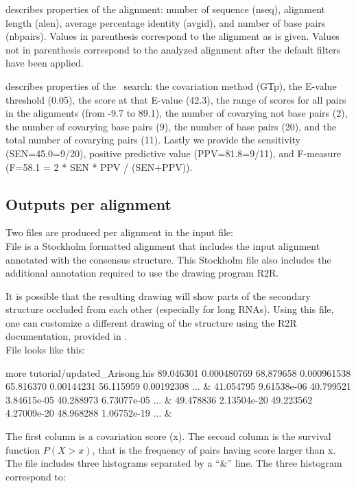  \begin{sreitems}{}
 \item[\prog{First comment line}]describes properties of the
   alignment: number of sequence (nseq), alignment length (alen),
   average percentage identity (avgid), and number of base pairs
   (nbpairs).  Values in parenthesis correspond to the alignment as is
   given. Values not in parenthesis correspond to the analyzed
   alignment after the default filters have been applied.

 \item[\prog{Second comment line}]describes properties of the
   \rscape\ search: the covariation method (GTp), the E-value threshold
   (0.05), the score at that E-value (42.3), the range of scores for all
   pairs in the alignments (from -9.7 to 89.1), the number of covarying
   not base pairs (2), the number of covarying base pairs (9), the
   number of base pairs (20), and the total number of covarying pairs
   (11). Lastly we provide the sensitivity (SEN=45.0=9/20), positive
   predictive value (PPV=81.8=9/11), and F-measure (F=58.1 = 2 * SEN *
   PPV / (SEN+PPV)).
 \end{sreitems}


 \subsection{Outputs per alignment}
 Two files are produced per alignment in the input file: \\

 File  is a Stockholm
 formatted alignment that includes the input alignment annotated with
 the consensus structure. This Stockholm file also includes the
 additional annotation required to use the drawing program R2R.

 It is possible that the resulting drawing will show parts of the
 secondary structure occluded from each other (especially for long
 RNAs).  Using this file, one can customize a different drawing of the
 structure using the R2R documentation, provided in
 .\\

 File  looks like this:
 \begin{sreoutput}
 more tutorial/updated_Arisong.his
 89.046301       0.000480769
 68.879658       0.000961538
 65.816370       0.00144231
 56.115959       0.00192308
 ...
 &
 41.054795       9.61538e-06
 40.799521       3.84615e-05
 40.288973       6.73077e-05
 ...
 &
 49.478836       2.13504e-20
 49.223562       4.27009e-20
 48.968288       1.06752e-19
 ...
 &
 \end{sreoutput}
 The first column is a covariation score (x). The second column is the
 survival function $P(X > x)$, that is the frequency of pairs having
 score larger than x. The file includes three histograms separated by a
 ``\&'' line. The three histogram correspond to:

